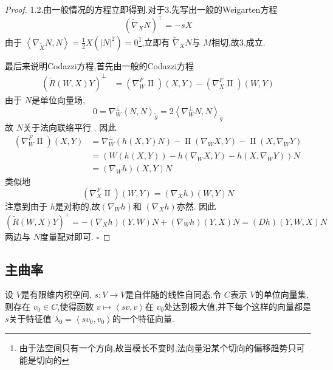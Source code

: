 \documentclass[../../几何与拓扑.tex]{subfiles}
\begin{document}
\begin{proof}
    1.2.由一般情况的方程立即得到.对于3.先写出一般的Weigarten方程 \[
    \left(  \tilde{\nabla} _{X}N \right)^{\top}= -sX 
    \]由于 \(  \left< \nabla _{\tilde{X}}N,N \right>  = \frac{1}{2}X\left( \left| N \right|^{2}  \right) = 0\)\footnote{由于法空间只有一个方向,故当模长不变时,法向量沿某个切向的偏移趋势只可能是切向的},立即有 \(   \tilde{\nabla} _{X}N  \)与 \(  M  \)相切,故3.成立.   

    最后来说明Codazzi方程,首先由一般的Codazzi方程 \[
    \begin{aligned}
\left( \tilde{R}\left( W,X \right)Y  \right)^{\perp} &= \left(  \nabla _{W}^{F}\operatorname{II}  \right)\left( X,Y \right)    -\left(  \nabla _{X}^{F}\operatorname{II}  \right)\left( W,Y \right)  
    \end{aligned}
    \]由于 \(  N  \)是单位向量场, \[
    0=  \nabla _{W}^{\perp}\left<N,N \right>_{\tilde{g}}=  2\left< \nabla _{W}^{\perp}N,N \right>_{\tilde{g}}
    \]故 \(  N  \)关于法向联络平行 .  因此 \[
   \begin{aligned}
    \left(  \nabla _{W}^{F}\operatorname{II}  \right)\left( X,Y \right)&=  \nabla _{W}^{\perp}\left( h\left( X,Y \right)N  \right)- \operatorname{II} \left(  \nabla _{W}X,Y \right)-\operatorname{II} \left( X, \nabla _{W}Y \right)\\ 
     &= \left( W\left( h\left( X,Y \right)  \right) -h\left(  \nabla _{W}X,Y \right)- h\left( X, \nabla _{W}Y \right)   \right)N    \\ 
      &= \left(  \nabla _{W}h \right)\left( X,Y \right)   N
   \end{aligned}  
    \]类似地 \[
    \left(  \nabla _{X}^{F}\operatorname{II}  \right)\left( W,Y \right)= \left( \nabla _{X}h \right)\left( W,Y \right)N  
    \]注意到由于 \(  h  \)是对称的,故\(  \left(  \nabla _{W}h \right)   \)和  \(  \left(  \nabla _{X}h \right)   \)亦然.   因此 \[
    \left( \tilde{R}\left( W,X \right)Y  \right)^{\perp} = - \left(  \nabla _{X}h \right)\left(Y,W \right)N+  \left(  \nabla _{W}h \right)\left( Y,X \right)N     = \left( Dh \right)\left( Y,W,X \right)N  
    \]两边与 \(  N  \)度量配对即可. 
    \hfill $\square$
\end{proof}

\subsection{主曲率}

\begin{lemma}
    设 \(  V  \)是有限维内积空间, \( s:V\to V  \)是自伴随的线性自同态.令 \(  C  \)表示 \(  V  \)的单位向量集,则存在 \(  v_0 \in C  \),使得函数 \(  v\mapsto \left<sv,v \right>  \)在 \(  v_0  \)处达到极大值,并下每个这样的向量都是 \(  s  \)关于特征值 \(   \lambda _0 = \left<sv_0,v_0 \right>  \)的一个特征向量.         
\end{lemma}
\end{document}
